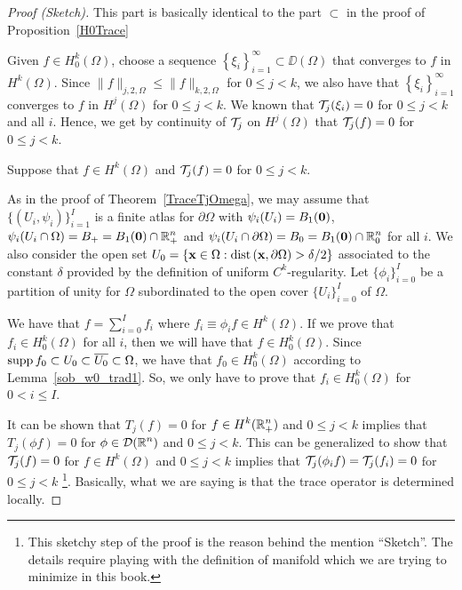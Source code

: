 \begin{proof}[Proof (Sketch)]
\subI{$\mathbf{\subset}$}  This part is basically identical to the
part $\mathbf{\subset}$ in the proof of Proposition~\ref{H0Trace}

Given $\displaystyle f \in H^k_0(\Omega)$, choose a sequence
$\displaystyle \left\{\xi_i\right\}_{i=1}^\infty \subset \DD(\Omega)$
that converges to $f$ in $\displaystyle H^k(\Omega)$.
Since $\|f\|_{j,2,\Omega} \leq \|f\|_{k,2,\Omega}$ for $0\leq j < k$,
we also have that $\displaystyle \left\{\xi_i\right\}_{i=1}^\infty$
converges to $f$ in $\displaystyle H^j(\Omega)$ 
for $0\leq j < k$.  We known that $\mathcal{T}_j(\xi_i) = 0$ for $0 \leq j < k$
and all $i$.  Hence, we get by continuity of $\mathcal{T}_j$ on
$\displaystyle H^j(\Omega)$ that $\mathcal{T}_j(f) = 0$ for $0 \leq j < k$.

\subI{$\mathbf{\supset}$}
Suppose that $\displaystyle f \in H^k(\Omega)$ and
$\mathcal{T}_j(f) = 0$ for $0 \leq j < k$.

As in the proof of Theorem~\ref{TraceTjOmega}, we may assume that
$\displaystyle \{ (U_i,\psi_i) \}_{i=1}^I$ is a finite atlas for
$\partial \Omega$ with $\psi_i(U_i) = B_1(\mathbf{0})$,
$\displaystyle \psi_i(U_i \cap \Omega) = B_+ = B_1(\mathbf{0}) \cap \mathbb{R}^n_+$
and
$\displaystyle \psi_i(U_i \cap \partial \Omega) = B_0 = B_1(\mathbf{0})
\cap \mathbb{R}^n_0$ for all $i$.  We also consider the open set
$\displaystyle U_0 = \left\{ \mathbf{x} \in \Omega :
\mathrm{dist}\left(\mathbf{x},\partial \Omega\right)  > \delta/2 \right\}$
associated to the constant $\delta$ provided by the definition
of uniform $\displaystyle C^k$-regularity.
Let $\displaystyle \{ \phi_i \}_{i=0}^I$ be a partition of unity for
$\Omega$ subordinated to the open cover $\displaystyle \{ U_i \}_{i=0}^I$
of $\Omega$.

We have that $\displaystyle f = \sum_{i=0}^I f_i$ where
$\displaystyle f_i \equiv \phi_i f \in H^k(\Omega)$.  If we prove that
$\displaystyle f_i \in H^k_0(\Omega)$ for all $i$, then we will
have that $\displaystyle f \in H^k_0(\Omega)$.
Since $\operatorname{supp} f_0 \subset U_0 \subset \overline{U_0} \subset \Omega$, we
have that $\displaystyle f_0 \in H^k_0(\Omega)$ according to
Lemma~\ref{sob_w0_trad1}.  So, we only have to prove
that $\displaystyle f_i \in H^k_0(\Omega)$ for $0 < i \leq I$.

It can be shown that $T_j(f) = 0$ for
$\displaystyle f \in H^k(\mathbb{R}_+^n)$ and $0 \leq j <k$
implies that $\displaystyle T_j(\phi f) = 0$ for
$\displaystyle \phi \in \mathcal{D}(\mathbb{R}^n)$ and $0 \leq j <k$.   This can be
generalized to show that $\mathcal{T}_j(f) = 0$ for
$\displaystyle f \in H^k(\Omega)$ and $0 \leq j <k$
implies that $\displaystyle \mathcal{T}_j(\phi_i f) = \mathcal{T}_j(f_i) = 0$ for
$0 \leq j <k$ \footnote{This sketchy step of the proof is the reason behind
the mention ``Sketch''.  The details require playing with the
definition of manifold which we are trying to minimize in this book.}.
Basically, what we are saying is that the trace operator is
determined locally.


\end{proof}
